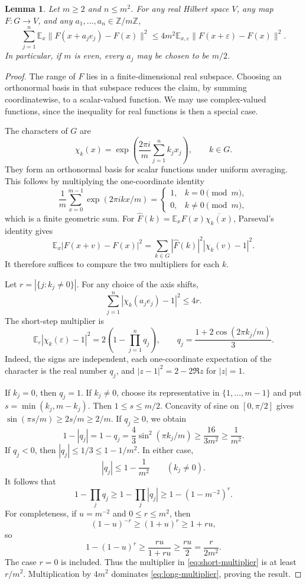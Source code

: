 \documentclass[11pt]{article}
\numberwithin{equation}{section}
\newtheorem{lemma}[theorem]{Lemma}
\theoremstyle{definition}
\newcommand{\Z}{\mathbb Z}
\newcommand{\E}{\mathbb E}
\begin{document}
\begin{lemma}\label{lem:torus-inequality}
Let $m\ge2$ and $n\le m^2$. For any real Hilbert space $V$, any map
$F:G\to V$, and any $a_1,\ldots,a_n\in\Z/m\Z$,
\begin{equation}\label{eq:torus}
 \sum_{j=1}^n\E_x\|F(x+a_je_j)-F(x)\|^2
 \le4m^2\E_{x,\varepsilon}\|F(x+\varepsilon)-F(x)\|^2.
\end{equation}
In particular, if $m$ is even, every $a_j$ may be chosen to be $m/2$.
\end{lemma}
\begin{proof}
The range of $F$ lies in a finite-dimensional real subspace. Choosing
an orthonormal basis in that subspace reduces the claim, by summing
coordinatewise, to a scalar-valued function. We may use complex-valued
functions, since the inequality for real functions is then a special case.

The characters of $G$ are
\[
 \chi_k(x)=\exp\left(\frac{2\pi i}{m}\sum_{j=1}^nk_jx_j\right),
 \qquad k\in G.
\]
They form an orthonormal basis for scalar functions under uniform
averaging. This follows by multiplying the one-coordinate identity
\[
 \frac1m\sum_{x=0}^{m-1}\exp(2\pi i kx/m)
 =\begin{cases}1,&k=0\pmod m,\\0,&k\ne0\pmod m,\end{cases}
\]
which is a finite geometric sum. For
$\widehat F(k)=\E_xF(x)\overline{\chi_k(x)}$, Parseval's identity gives
\[
 \E_x|F(x+v)-F(x)|^2
 =\sum_{k\in G}|\widehat F(k)|^2|\chi_k(v)-1|^2.
\]
It therefore suffices to compare the two multipliers for each $k$.

Let $r=|\{j:k_j\ne0\}|$. For any choice of the axis shifts,
\begin{equation}\label{eq:long-multiplier}
 \sum_{j=1}^n|\chi_k(a_je_j)-1|^2\le4r.
\end{equation}
The short-step multiplier is
\begin{equation}\label{eq:short-multiplier}
 \E_\varepsilon|\chi_k(\varepsilon)-1|^2
 =2\left(1-\prod_{j=1}^n q_j\right),\qquad
 q_j=\frac{1+2\cos(2\pi k_j/m)}3.
\end{equation}
Indeed, the signs are independent, each one-coordinate expectation of
the character is the real number $q_j$, and $|z-1|^2=2-2\Re z$ for
$|z|=1$.

If $k_j=0$, then $q_j=1$. If $k_j\ne0$, choose its representative
in $\{1,\ldots,m-1\}$ and put
$s=\min(k_j,m-k_j)$. Then $1\le s\le m/2$. Concavity of sine on
$[0,\pi/2]$ gives $\sin(\pi s/m)\ge2s/m\ge2/m$.
If $q_j\ge0$, we obtain
\[
 1-|q_j|=1-q_j=\frac43\sin^2(\pi k_j/m)
 \ge\frac{16}{3m^2}\ge\frac1{m^2}.
\]
If $q_j<0$, then $|q_j|\le1/3\le1-1/m^2$. In either case,
\[
 |q_j|\le1-\frac1{m^2}\qquad(k_j\ne0).
\]
It follows that
\[
 1-\prod_jq_j\ge1-\prod_j|q_j|
 \ge1-(1-m^{-2})^r.
\]
For completeness, if $u=m^{-2}$ and $0\le r\le m^2$, then
\[
 (1-u)^{-r}\ge(1+u)^r\ge1+ru,
\]
so
\[
 1-(1-u)^r\ge\frac{ru}{1+ru}\ge\frac{ru}{2}
 =\frac{r}{2m^2}.
\]
The case $r=0$ is included. Thus the multiplier in
\eqref{eq:short-multiplier} is at least $r/m^2$. Multiplication by
$4m^2$ dominates \eqref{eq:long-multiplier}, proving the result.
\end{proof}
\end{document}
